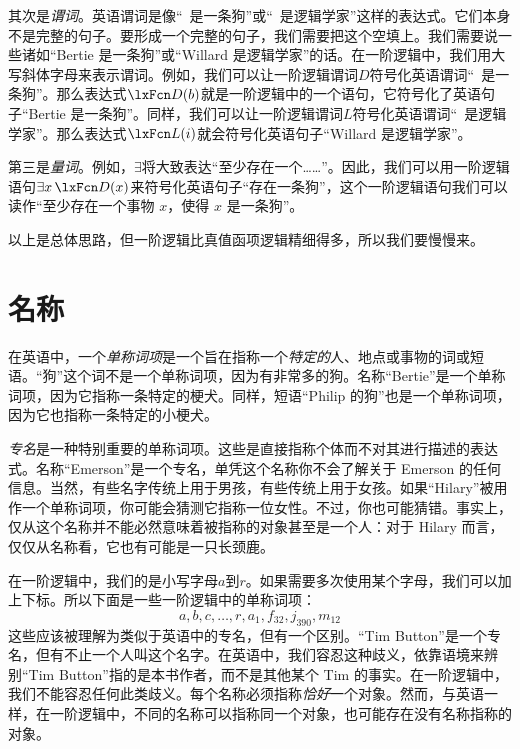 其次是\emph{谓词}。英语谓词是像“\blank\ 是一条狗”或“\blank\ 是逻辑学家”这样的表达式。它们本身不是完整的句子。要形成一个完整的句子，我们需要把这个空填上。我们需要说一些诸如“Bertie 是一条狗”或“Willard 是逻辑学家”的话。在一阶逻辑中，我们用大写斜体字母来表示谓词。例如，我们可以让一阶逻辑谓词$D$符号化英语谓词“\blank\ 是一条狗”。那么表达式$\atom{D}{b}$就是一阶逻辑中的一个语句，它符号化了英语句子“Bertie 是一条狗”。同样，我们可以让一阶逻辑谓词$L$符号化英语谓词“\blank\ 是逻辑学家”。那么表达式$\atom{L}{i}$就会符号化英语句子“Willard 是逻辑学家”。

第三是\emph{量词}。例如，$\exists$将大致表达“至少存在一个……”。因此，我们可以用一阶逻辑语句$\exists x\, \atom{D}{x}$来符号化英语句子“存在一条狗”，这个一阶逻辑语句我们可以读作“至少存在一个事物 $x$，使得 $x$ 是一条狗”。

以上是总体思路，但一阶逻辑比真值函项逻辑精细得多，所以我们要慢慢来。

\section{名称}
在英语中，一个\emph{单称词项}是一个旨在指称一个\emph{特定的}人、地点或事物的词或短语。“狗”这个词不是一个单称词项，因为有非常多的狗。名称“Bertie”是一个单称词项，因为它指称一条特定的梗犬。同样，短语“Philip 的狗”也是一个单称词项，因为它也指称一条特定的小梗犬。

\emph{专名}是一种特别重要的单称词项。这些是直接指称个体而不对其进行描述的表达式。名称“Emerson”是一个专名，单凭这个名称你不会了解关于 Emerson 的任何信息。当然，有些名字传统上用于男孩，有些传统上用于女孩。如果“Hilary”被用作一个单称词项，你可能会猜测它指称一位女性。不过，你也可能猜错。事实上，仅从这个名称并不能必然意味着被指称的对象甚至是一个人：对于 Hilary 而言，仅仅从名称看，它也有可能是一只长颈鹿。

在一阶逻辑中，我们的是小写字母$a$到$r$。如果需要多次使用某个字母，我们可以加上下标。所以下面是一些一阶逻辑中的单称词项：
	$$a,b,c,\ldots, r, a_1, f_{32}, j_{390}, m_{12}$$ 这些应该被理解为类似于英语中的专名，但有一个区别。“Tim Button”是一个专名，但有不止一个人叫这个名字。在英语中，我们容忍这种歧义，依靠语境来辨别“Tim Button”指的是本书作者，而不是其他某个 Tim 的事实。在一阶逻辑中，我们不能容忍任何此类歧义。每个名称必须指称\emph{恰好}一个对象。然而，与英语一样，在一阶逻辑中，不同的名称可以指称同一个对象，也可能存在没有名称指称的对象。



